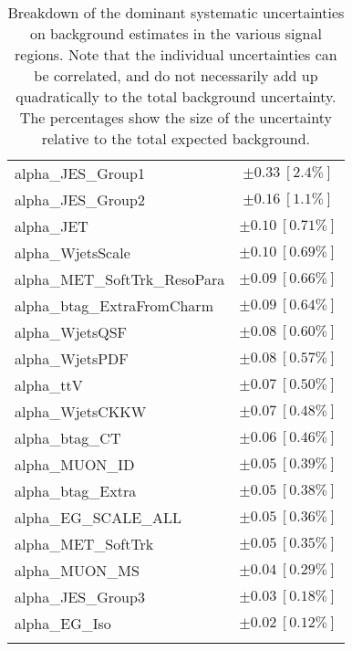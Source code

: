 \begin{table}
\begin{center}
\begin{tabular*}{\textwidth}{@{\extracolsep{\fill}}lc}
alpha\_JES\_Group1         & $\pm 0.33\ [2.4\%] $       \\
alpha\_JES\_Group2         & $\pm 0.16\ [1.1\%] $       \\
alpha\_JET         & $\pm 0.10\ [0.71\%] $       \\
alpha\_WjetsScale         & $\pm 0.10\ [0.69\%] $       \\
alpha\_MET\_SoftTrk\_ResoPara         & $\pm 0.09\ [0.66\%] $       \\
alpha\_btag\_ExtraFromCharm         & $\pm 0.09\ [0.64\%] $       \\
alpha\_WjetsQSF         & $\pm 0.08\ [0.60\%] $       \\
alpha\_WjetsPDF         & $\pm 0.08\ [0.57\%] $       \\
alpha\_ttV         & $\pm 0.07\ [0.50\%] $       \\
alpha\_WjetsCKKW         & $\pm 0.07\ [0.48\%] $       \\
alpha\_btag\_CT         & $\pm 0.06\ [0.46\%] $       \\
alpha\_MUON\_ID         & $\pm 0.05\ [0.39\%] $       \\
alpha\_btag\_Extra         & $\pm 0.05\ [0.38\%] $       \\
alpha\_EG\_SCALE\_ALL         & $\pm 0.05\ [0.36\%] $       \\
alpha\_MET\_SoftTrk         & $\pm 0.05\ [0.35\%] $       \\
alpha\_MUON\_MS         & $\pm 0.04\ [0.29\%] $       \\
alpha\_JES\_Group3         & $\pm 0.03\ [0.18\%] $       \\
alpha\_EG\_Iso         & $\pm 0.02\ [0.12\%] $       \\
\noalign{\smallskip}\hline\noalign{\smallskip}
\end{tabular*}
\end{center}
\caption[Breakdown of uncertainty on background estimates]{
Breakdown of the dominant systematic uncertainties on background estimates in the various signal regions.
Note that the individual uncertainties can be correlated, and do not necessarily add up quadratically to 
the total background uncertainty. The percentages show the size of the uncertainty relative to the total expected background.
\label{table.results.bkgestimate.uncertainties.VRtt2offEM_cuts}}
\end{table}
%